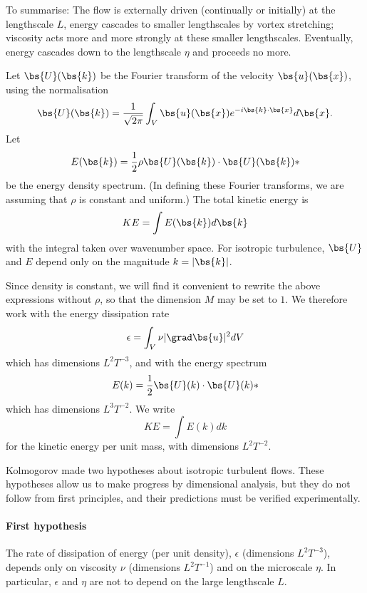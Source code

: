 To summarise: The flow is externally driven (continually or initially) at the lengthscale $L$, energy cascades to smaller lengthscales by vortex stretching; viscosity acts more and more strongly at these smaller lengthscales. Eventually, energy cascades down to the lengthscale $\eta$ and proceeds no more.

Let $\bs{U}(\bs{k})$ be the Fourier transform of the velocity $\bs{u}(\bs{x})$, 
using the normalisation
\begin{equation}
    \bs{U}(\bs{k}) = \frac{1}{\sqrt{2\pi}} \int_V \bs{u}(\bs{x}) e^{-i\bs{k}\cdot\bs{x}} d\bs{x}.
\end{equation}
Let 
\begin{equation}
    E(\bs{k}) = \frac{1}{2}\rho\bs{U}(\bs{k})\cdot\bs{U}(\bs{k})*
\end{equation}
be the energy density spectrum. (In defining these Fourier transforms, we are
assuming that $\rho$ is constant and uniform.) The total kinetic energy is
\begin{equation}
    KE = \int E(\bs{k}) d\bs{k}
\end{equation}
with the integral taken over wavenumber space. For isotropic turbulence,
$\bs{U}$ and $E$ depend only on the magnitude $k=|\bs{k}|$. 

Since density is constant, we will find it convenient to rewrite the above expressions without $\rho$, so that the dimension $M$ may be set to $1$. We therefore work with the energy dissipation rate 
\begin{equation}
    \epsilon = \int_V\nu|\grad\bs{u}|^2dV
\end{equation}
which has dimensions $L^2 T^{-3}$, and with the energy spectrum
\begin{equation}
    E(k) = \frac{1}{2}\bs{U}(k)\cdot\bs{U}(k)*
\end{equation}
which has dimensions $L^3 T^{-2}$. We write 
\begin{equation}
    KE = \int E(k) dk
\end{equation}
for the kinetic energy per unit mass, with dimensions $L^2 T^{-2}$.

Kolmogorov made two hypotheses about isotropic turbulent flows. These hypotheses allow us to make progress by dimensional analysis, but they do not follow from first principles, and their predictions must be verified experimentally.

\paragraph{First hypothesis} The rate of dissipation of energy (per unit
density), $\epsilon$ (dimensions $L^2T^{-3}$), depends only on viscosity $\nu$
(dimensions $L^2T^{-1}$) and on the microscale $\eta$. In particular, $\epsilon$ and
$\eta$ are not to depend on the large lengthscale $L$.

